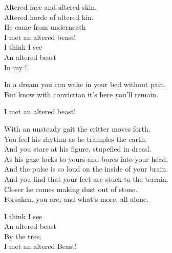 Altered face and altered skin. \\
Altered horde of altered kin. \\

He came from underneath \\
I met an altered beast! \\

I think I see \\
An altered beast \\
In my ! \\


In a dream you can wake in your bed without pain. \\
But know with conviction it's here you'll remain. \\


I met an altered beast! \\


With an unsteady gait the critter moves forth. \\
You feel his rhythm as he tramples the earth. \\

And you stare at his figure, stupefied in dread. \\
As his gaze locks to yours and bores into your head. \\

And the pulse is so loud on the inside of your brain. \\
And you find that your feet are stuck to the terrain. \\

Closer he comes making dust out of stone. \\
Forsaken, you are, and what's more, all alone. \\


I think I see \\
An altered beast \\
By the tree. \\

I met an altered Beast! \\




